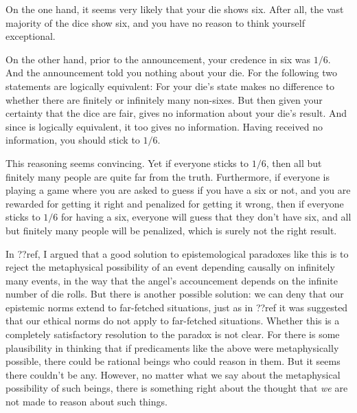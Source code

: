 On the one hand, it seems very likely that your die shows six. After all, the vast majority of the dice show
six, and you have no reason to think yourself exceptional. 

On the other hand, prior to the announcement, your credence in six was $1/6$. And the announcement told you nothing 
about your die. For the following two statements are logically equivalent:
For your die's state makes no difference to whether there are finitely or infinitely many non-sixes.
But then given your certainty that the dice are fair,  gives no information about 
your die's result. And since  is logically equivalent, it too gives no information.
Having received no information, you should stick to $1/6$. 

This reasoning seems convincing. Yet if everyone sticks to $1/6$, then all but finitely many people are quite far 
from the truth. Furthermore, if everyone is playing a game where you are asked to guess if you have a six or not,
and you are rewarded for getting it right and penalized for getting it wrong, then if everyone sticks to $1/6$
for having a six, everyone will guess that they don't have six, and all but finitely many people will be penalized,
which is surely not the right result.

In ??ref, I argued that a good solution to epistemological paradoxes like this is to reject the metaphysical possibility
of an event depending causally on infinitely many events, in the way that the angel's accouncement depends on the infinite
number of die rolls. But there is another possible solution: we can deny that our epistemic norms extend to far-fetched
situations, just as in ??ref it was suggested that our ethical norms do not apply to far-fetched situations. Whether this is 
a completely satisfactory resolution to the paradox is not clear. For there is some plausibility in thinking that if 
predicaments like the above were metaphysically possible, there could be rational beings who could reason
in them. But it seems there couldn't be any. However, no matter what we say about the metaphysical possibility of such beings,
there is something right about the thought that \textit{we} are not made to reason about such things.

